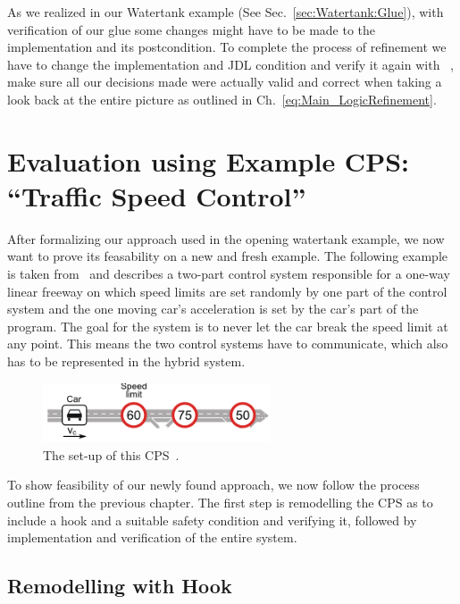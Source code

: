 As we realized in our Watertank example (See Sec.~\ref{sec:Watertank:Glue}), with verification of our glue some changes might have to be made to the implementation and its postcondition. To complete the process of refinement we have to change the implementation and JDL condition and verify it again with \key~, make sure all our decisions made were actually valid and correct when taking a look back at the entire picture as outlined in Ch.~\ref{eq:Main_LogicRefinement}.


\chapter{Evaluation using Example CPS: ``Traffic Speed Control''}
\label{ch:Traffic}

After formalizing our approach used in the opening watertank example, we now want to prove its feasability on a new and fresh example. The following example is taken from~\cite{TrafficControl} and describes a two-part control system responsible for a one-way linear freeway on which speed limits are set randomly by one part of the control system and the one moving car's acceleration is set by the car's part of the program. The goal for the system is to never let the car break the speed limit at any point. This means the two control systems have to communicate, which also has to be represented in the hybrid system.  

\begin{figure}[h!]
	\centering
	\includegraphics[width=0.6\textwidth]{images/trafficControl}
	\caption{The set-up of this CPS~\cite{keymaera}.}
	\label{fig:trafficControl}
\end{figure}

To show feasibility of our newly found approach, we now follow the process outline from the previous chapter. The first step is remodelling the CPS as to include a hook and a suitable safety condition and verifying it, followed by implementation and verification of the entire system. 

\section{Remodelling with Hook}
\label{sec:traffic:hook}

